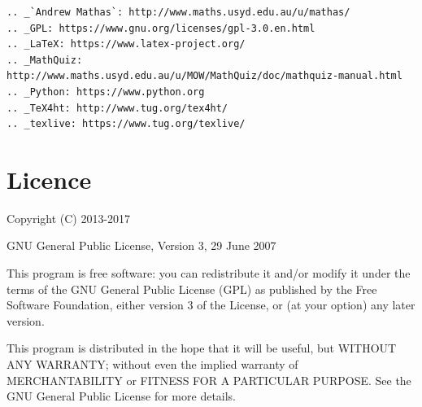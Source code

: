 \documentclass[svgnames]{article}
\begin{document}
\begin{verbatim}
.. _`Andrew Mathas`: http://www.maths.usyd.edu.au/u/mathas/
.. _GPL: https://www.gnu.org/licenses/gpl-3.0.en.html
.. _LaTeX: https://www.latex-project.org/
.. _MathQuiz: http://www.maths.usyd.edu.au/u/MOW/MathQuiz/doc/mathquiz-manual.html
.. _Python: https://www.python.org
.. _TeX4ht: http://www.tug.org/tex4ht/
.. _texlive: https://www.tug.org/texlive/
\end{verbatim}

\section{Licence}

Copyright (C) 2013-2017

GNU General Public License, Version 3, 29 June 2007

This program is free software: you can redistribute it and/or modify it under
the terms of the GNU General Public License (GPL) as published by the Free
Software Foundation, either version 3 of the License, or (at your option) any
later version.

This program is distributed in the hope that it will be useful, but WITHOUT ANY
WARRANTY; without even the implied warranty of MERCHANTABILITY or FITNESS FOR A
PARTICULAR PURPOSE.  See the GNU General Public License for more details.
\end{document}
